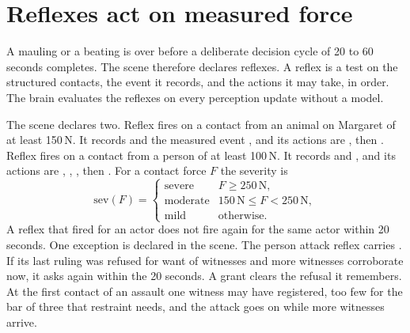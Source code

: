 \section{Reflexes act on measured force}\label{sec:cont-reflex}

A mauling or a beating is over before a deliberate decision cycle of 20 to 60 seconds completes. The
scene therefore declares reflexes. A reflex is a test on the structured contacts, the event it
records, and the actions it may take, in order. The brain evaluates the reflexes on every perception
update without a model.

The scene declares two. Reflex  fires on a contact from an animal on Margaret of at
least 150\,N. It records  and the measured event
, and its actions are , then .
Reflex  fires on a contact from a person of at least 100\,N. It records
 and , and its actions are ,
, , then . For a contact force $F$ the
severity is
\begin{equation}
\mathrm{sev}(F) =
\begin{cases}
\text{severe} & F \ge 250\,\mathrm{N},\\
\text{moderate} & 150\,\mathrm{N} \le F < 250\,\mathrm{N},\\
\text{mild} & \text{otherwise}.
\end{cases}
\label{eq:severity}
\end{equation}
A reflex that fired for an actor does not fire again for the same actor within 20 seconds.
One exception is declared in the scene.
The person attack reflex  carries .
If its last ruling was refused for want of witnesses and more witnesses corroborate now, it asks
again within the 20 seconds.
A grant clears the refusal it remembers.
At the first contact of an assault one witness may have registered, too few for the bar of three
that restraint needs, and the attack goes on while more witnesses arrive.

